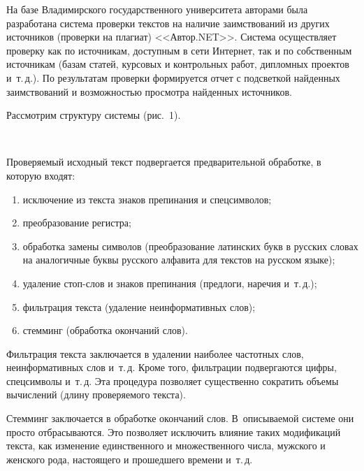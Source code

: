\begin{multicols}{2}
  На базе Владимирского государственного университета авторами была 
разработана сис\-те\-ма проверки текстов на наличие заимствований из других 
источников (проверки на плагиат) <<Автор.NET>>. Сис\-те\-ма осуществляет 
проверку как по источникам, доступным в сети Интернет, так и по собственным 
источникам (базам статей, курсовых и контрольных работ, дипломных 
проектов и~т.\,д.). По результатам проверки формируется отчет с подсветкой 
найденных заимствований и воз\-мож\-ностью просмотра найденных источников.

Рассмотрим структуру сис\-те\-мы (рис.~1).

\begin{figure*}
\vspace*{1pt}
 \begin{center}
 \mbox{%
 \epsfxsize=104.248mm
 }
 \end{center}
 \vspace*{-9pt}
\vspace*{6pt}
\end{figure*}

  Проверяемый исходный текст подвергается предварительной обработке, в 
которую входят:
  \begin{enumerate}[(1)]
  \item исключение из текста знаков препинания и спецсимволов;
  \item преобразование регистра;
  \item обработка замены символов (преобразование латинских букв в русских 
словах на аналогичные буквы русского алфавита для текстов на русском языке);
  \item удаление стоп-слов и знаков препинания (предлоги, наречия и~т.\,д.);
  \item фильтрация текста (удаление неинформативных слов);
  \item стемминг (обработка окончаний слов).
  \end{enumerate}
  
  Фильтрация текста заключается в удалении наиболее частотных слов, 
неинформативных слов и~т.\,д. Кроме того, фильтрации подвергаются цифры, 
спецсимволы и~т.\,д. Эта процедура позволяет существенно сократить объемы 
вычислений (длину проверяемого текста). 
  
  Стемминг заключается в обработке окончаний слов. В~описываемой 
  сис\-те\-ме они просто отбрасываются. Это позволяет исключить влияние 
таких модификаций текста, как изменение единственного и множественного 
числа, мужского и женского рода, настоящего и прошедшего времени и~т.\,д.
  

\end{multicols}
